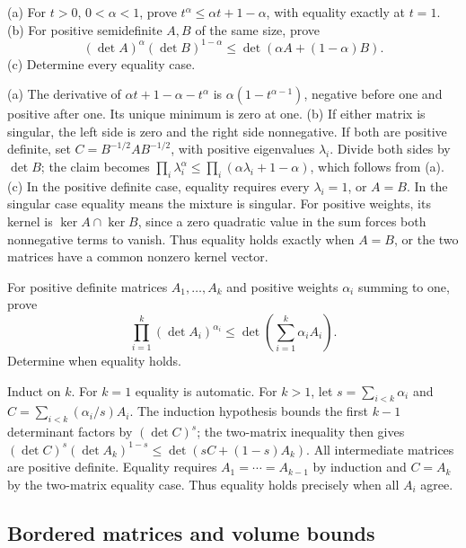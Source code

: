 \begin{problem}\label{ex:12:ineq-ma-21}
(a) For \(t>0\), \(0<\alpha<1\), prove
\(t^\alpha\leqslant\alpha t+1-\alpha\), with equality exactly at \(t=1\).
(b) For positive semidefinite \(A,B\) of the same size, prove
\[
(\det A)^\alpha(\det B)^{1-\alpha}
\leqslant\det(\alpha A+(1-\alpha)B).
\]
(c) Determine every equality case.
\end{problem}
\begin{solution}
(a) The derivative of \(\alpha t+1-\alpha-t^\alpha\) is
\(\alpha(1-t^{\alpha-1})\), negative before one and positive after one.
Its unique minimum is zero at one.
(b) If either matrix is singular, the left side is zero and the right
side nonnegative. If both are positive definite, set
\(C=B^{-1/2}AB^{-1/2}\), with positive eigenvalues \(\lambda_i\).
Divide both sides by \(\det B\); the claim becomes
\(\prod_i\lambda_i^\alpha\leqslant\prod_i(\alpha\lambda_i+1-\alpha)\),
which follows from (a).
(c) In the positive definite case, equality requires every \(\lambda_i=1\),
or \(A=B\). In the singular case equality means the mixture is singular.
For positive weights, its kernel is \(\ker A\cap\ker B\), since a zero
quadratic value in the sum forces both nonnegative terms to vanish.
Thus equality holds exactly when \(A=B\), or the two matrices have a
common nonzero kernel vector.
\end{solution}

\begin{problem}\label{ex:12:ineq-ma-22}
For positive definite matrices \(A_1,\ldots,A_k\) and positive weights
\(\alpha_i\) summing to one, prove
\[
\prod_{i=1}^k(\det A_i)^{\alpha_i}
\leqslant\det\left(\sum_{i=1}^k\alpha_iA_i\right).
\]
Determine when equality holds.
\end{problem}
\begin{solution}
Induct on \(k\). For \(k=1\) equality is automatic. For \(k>1\), let
\(s=\sum_{i<k}\alpha_i\) and \(C=\sum_{i<k}(\alpha_i/s)A_i\).
The induction hypothesis bounds the first \(k-1\) determinant factors
by \((\det C)^s\); the two-matrix inequality then gives
\((\det C)^s(\det A_k)^{1-s}\leqslant\det(sC+(1-s)A_k)\).
All intermediate matrices are positive definite. Equality requires
\(A_1=\cdots=A_{k-1}\) by induction and \(C=A_k\) by the two-matrix
equality case. Thus equality holds precisely when all \(A_i\) agree.
\end{solution}

\subsection*{Bordered matrices and volume bounds}

